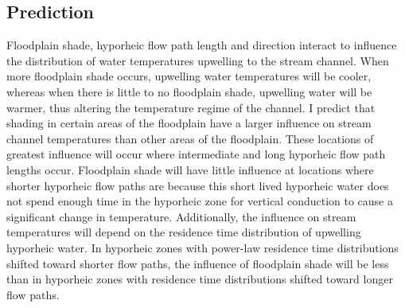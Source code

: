 \documentclass[a4paper]{article}
\begin{document}
\subsection*{Prediction}
Floodplain shade, hyporheic flow path length and direction interact to influence the distribution of water temperatures upwelling to the stream channel. When more floodplain shade occurs, upwelling water temperatures will be cooler, whereas when there is little to no floodplain shade, upwelling water will be warmer, thus altering the temperature regime of the channel. I predict that shading in certain areas of the floodplain have a larger influence on stream channel temperatures than other areas of the floodplain. These locations of greatest influence will occur where intermediate and long hyporheic flow path lengths occur. Floodplain shade will have little influence at locations where shorter hyporheic flow paths are because this short lived hyporheic water does not spend enough time in the hyporheic zone for vertical conduction to cause a significant change in temperature. Additionally, the influence on stream temperatures will depend on the residence time distribution of upwelling hyporheic water. In hyporheic zones with power-law residence time distributions shifted toward shorter flow paths, the influence of floodplain shade will be less than in hyporheic zones with residence time distributions shifted toward longer flow paths. 






\end{document}
